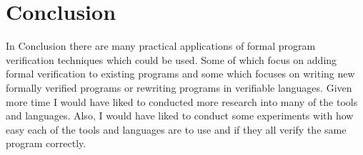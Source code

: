 \documentclass[a4paper,12pt]{scrartcl}
\begin{document}
	\section{Conclusion}
	{
		In Conclusion there are many practical applications of formal program verification techniques which could be used. Some of which focus on adding formal verification to existing programs and some which focuses on writing new formally verified programs or rewriting programs in verifiable languages. Given more time I would have liked to conducted more research into many of the tools and languages. Also, I would have liked to conduct some experiments with how easy each of the tools and languages are to use and if they all verify the same program correctly.
	}
	
	\newpage
	
	\printbibliography[heading=bibintoc,title=References]
\end{document}

